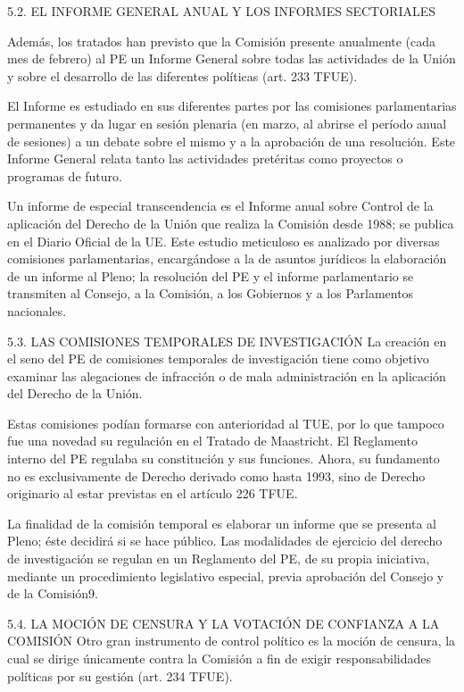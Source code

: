 \documentclass[10pt,a4paper]{article}
\begin{document}
5.2. EL INFORME GENERAL ANUAL Y LOS INFORMES SECTORIALES

Además, los tratados han previsto que la Comisión presente anualmente (cada mes de febrero) al PE un Informe General sobre todas las actividades de la Unión y sobre el desarrollo de las diferentes políticas (art. 233 TFUE).

El Informe es estudiado en sus diferentes partes por las comisiones parlamentarias permanentes y da lugar en sesión plenaria (en marzo, al abrirse el período anual de sesiones) a un debate sobre el mismo y a la aprobación de una resolución. Este Informe General relata tanto las actividades pretéritas como proyectos o programas de futuro.

Un informe de especial transcendencia es el Informe anual sobre Control de la aplicación del Derecho de la Unión que realiza la Comisión desde 1988; se publica en el Diario Oficial de la UE. Este estudio meticuloso es analizado por diversas comisiones parlamentarias, encargándose a la de asuntos jurídicos la elaboración de un informe al Pleno; la resolución del PE y el informe parlamentario se transmiten al Consejo, a la Comisión, a los Gobiernos y a los Parlamentos nacionales.


5.3. LAS COMISIONES TEMPORALES DE INVESTIGACIÓN
La creación en el seno del PE de comisiones temporales de investigación tiene como objetivo examinar las alegaciones de infracción o de mala administración en la aplicación del Derecho de la Unión.

Estas comisiones podían formarse con anterioridad al TUE, por lo que tampoco fue una novedad su regulación en el Tratado de Maastricht. El Reglamento interno del PE regulaba su constitución y sus funciones. Ahora, su fundamento no es exclusivamente de Derecho derivado como hasta 1993, sino de Derecho originario al estar previstas en el artículo 226 TFUE.

La finalidad de la comisión temporal es elaborar un informe que se presenta al Pleno; éste decidirá si se hace público. Las modalidades de ejercicio del derecho de investigación se regulan en un Reglamento del PE, de su propia iniciativa, mediante un procedimiento legislativo especial, previa aprobación del Consejo y de la Comisión9.

5.4. LA MOCIÓN DE CENSURA Y LA VOTACIÓN DE CONFIANZA A LA
COMISIÓN
Otro gran instrumento de control político es la moción de censura, la cual se dirige únicamente contra la Comisión a fin de exigir responsabilidades políticas por su gestión (art. 234 TFUE).
\end{document}
